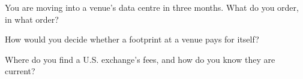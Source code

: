 \begin{interviewq}\label{iq:nw:colocation-products-and-how-they-are-sold:4}
You are moving into a venue's data centre in three months. What do you order, in what order?
\end{interviewq}

\begin{interviewq}\label{iq:nw:colocation-products-and-how-they-are-sold:5}
How would you decide whether a  footprint at a venue pays for itself?
\end{interviewq}

\begin{interviewq}\label{iq:nw:colocation-products-and-how-they-are-sold:6}
Where do you find a U.S. exchange's  fees, and how do you know they are current?
\end{interviewq}
